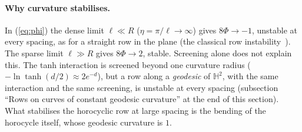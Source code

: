 \documentclass[11pt]{article}
\theoremstyle{remark}
\begin{document}
\paragraph{Why curvature stabilises.} In (\ref{eq:phi}) the dense limit $\ell\ll R$ ($\eta=\pi/\ell\to\infty$) gives
$8\Phi\to-1$, unstable at every spacing, as for a straight row in the plane (the classical row instability~\cite{Lamb}).
The sparse limit $\ell\gg R$ gives $8\Phi\to2$, stable. Screening alone does not explain this. The tanh interaction is screened beyond one curvature radius
($-\ln\tanh(d/2)\approx2e^{-d}$), but a row along a \emph{geodesic} of $\mathbb H^2$, with the same interaction and the same
screening, is unstable at every spacing (subsection ``Rows on curves of constant geodesic curvature'' at the end of
this section). What stabilises the horocyclic row at large spacing is the bending of the horocycle itself, whose geodesic
curvature is $1$.
\end{document}
